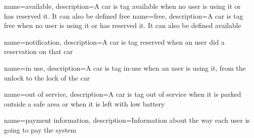 {
	name={available},
	description={A car is tag available when no user is using it or has reserved it. It can also be defined free}
}
{
	name={free},
	description={A car is tag free when no user is using it or has reserved it. It can also be defined available}
}

{
	name={notification},
	description={A car is tag reserved when an user did a reservation on that car}
}

{
	name={in use},
	description={A car is tag in-use when an user is using it, from the unlock to the lock of the car}
}

{
	name={out of service},
	description={A car is tag out of service when it is parked outside a safe area or when it is left with low battery}
}

{
	name={payment information},
	description={Information about the way each user is going to pay the system }
}
\begin{comment}
\newglossaryentry{battery}
{
  name={battery},
  description={},
  plural={batteries}
}
\end{comment}




